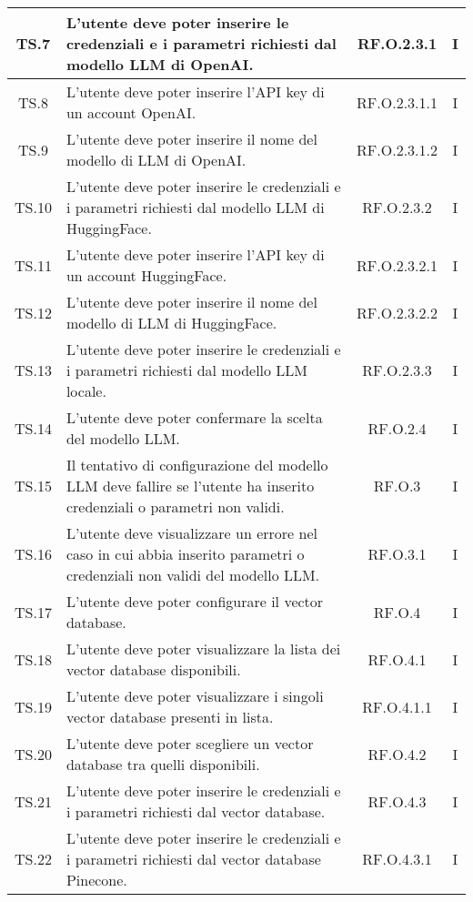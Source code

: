 {{{{{{{{{\begin{xltabular}{\textwidth}{|c|X|c|c|}
    \hline
    TS.7 & L’utente deve poter inserire le credenziali e i parametri richiesti dal modello LLM di OpenAI. & RF.O.2.3.1 & I \\
    \hline
    TS.8 & L’utente deve poter inserire l’API key di un account OpenAI. & RF.O.2.3.1.1 & I \\
    \hline
    TS.9 & L’utente deve poter inserire il nome del modello di LLM di OpenAI. & RF.O.2.3.1.2 & I \\
    \hline
    TS.10 & L’utente deve poter inserire le credenziali e i parametri richiesti dal modello LLM di HuggingFace. & RF.O.2.3.2 & I \\
    \hline
    TS.11 & L’utente deve poter inserire l’API key di un account HuggingFace. & RF.O.2.3.2.1 & I \\
    \hline
    TS.12 & L’utente deve poter inserire il nome del modello di LLM di HuggingFace. & RF.O.2.3.2.2 & I \\
    \hline
    TS.13 & L’utente deve poter inserire le credenziali e i parametri richiesti dal modello LLM locale. & RF.O.2.3.3 & I \\
    \hline
    TS.14 & L’utente deve poter confermare la scelta del modello LLM. & RF.O.2.4 & I \\
    \hline
    TS.15 & Il tentativo di configurazione del modello LLM deve fallire se l’utente ha inserito credenziali o parametri non validi. & RF.O.3 & I \\
    \hline
    TS.16 & L’utente deve visualizzare un errore nel caso in cui abbia inserito parametri o credenziali non validi del modello LLM. & RF.O.3.1 & I \\
    \hline
    TS.17 & L’utente deve poter configurare il vector database. & RF.O.4 & I \\
    \hline
    TS.18 & L’utente deve poter visualizzare la lista dei vector database disponibili. & RF.O.4.1 & I \\
    \hline
    TS.19 & L’utente deve poter visualizzare i singoli vector database presenti in lista. & RF.O.4.1.1 & I \\
    \hline
    TS.20 & L’utente deve poter scegliere un vector database tra quelli disponibili. & RF.O.4.2 & I \\
    \hline
    TS.21 & L’utente deve poter inserire le credenziali e i parametri richiesti dal vector database. & RF.O.4.3 & I \\
    \hline
    TS.22 & L’utente deve poter inserire le credenziali e i parametri richiesti dal vector database Pinecone. & RF.O.4.3.1 & I \\

\end{xltabular}}}}}}}}}}
